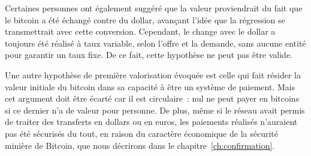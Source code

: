 
Certaines personnes ont également suggéré que la valeur proviendrait du fait que le bitcoin a été échangé contre du dollar, avançant l'idée que la régression se transmettrait avec cette conversion. Cependant, le change avec le dollar a toujours été réalisé à taux variable, selon l'offre et la demande, sans aucune entité pour garantir un taux fixe. De ce fait, cette hypothèse ne peut pas être valide.


Une autre hypothèse de première valorisation évoquée est celle qui fait résider la valeur initiale du bitcoin dans sa capacité à être un système de paiement. Mais cet argument doit être écarté car il est circulaire~: nul ne peut payer en bitcoins si ce dernier n'a de valeur pour personne. De plus, même si le réseau avait permis de traiter des transferts en dollars ou en euros, les paiements réalisés n'auraient pas été sécurisés du tout, en raison du caractère économique de la sécurité minière de Bitcoin, que nous décrirons dans le chapitre~\ref{ch:confirmation}.



